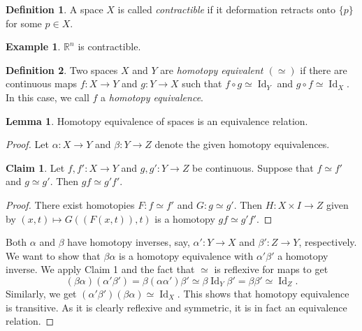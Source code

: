 \documentclass[10pt,letterpaper,cm]{nupset}
\theoremstyle{definition}
\newtheorem*{definition}{Definition}
\newtheorem{exmp}{Example}
\newtheorem{claim}{Claim}
\newtheorem{lemma}{Lemma}
\newcommand{\R}{\mathbb R}
\newcommand{\1}{\mathbf{1}}
\newcommand{\0}{\vec 0}
\DeclareMathOperator{\id}{Id}
\begin{document}
\begin{definition}
A space $X$ is called \textit{contractible} if it deformation retracts onto $\{p\}$ for some $p\in X$.
\end{definition}

\begin{exmp}
$\R^n$ is contractible.
\end{exmp}

\begin{definition}
Two spaces $X$ and $Y$ are \textit{homotopy equivalent $(\simeq)$} if there are continuous maps $f: X\to Y$ and $g: Y \to X$ such that $f\circ g \simeq \id_Y$ and $g\circ f \simeq \id_X$. In this case, we call $f$ a \textit{homotopy equivalence}.
\end{definition}

\begin{lemma}
Homotopy equivalence of spaces is an equivalence relation.
\end{lemma}
\begin{proof}
Let $\alpha : X \to Y$ and $\beta: Y \to Z$ denote the given homotopy equivalences. 
\begin{claim}
Let $f, f': X \to Y$ and $g,g' : Y \to Z$ be continuous. Suppose that $f\simeq f'$ and $g \simeq g'$. Then $gf \simeq g'f'$.
\end{claim}
\begin{proof}
There exist homotopies $F: f \simeq f'$ and $G: g \simeq g'$. Then $H: X \times I \to Z$ given by $(x,t) \mapsto G((F(x, t)), t)$ is a homotopy $gf \simeq g'f'$.
\end{proof}
Both $\alpha$ and $\beta$ have homotopy inverses, say, $\alpha': Y \to X$ and $\beta': Z \to Y$, respectively.  We want to show that $\beta \alpha$ is a homotopy equivalence with  $\alpha ' \beta'$ a homotopy inverse. We apply Claim 1 and the fact that $\simeq$ is reflexive for maps to get $$(\beta \alpha)(\alpha' \beta') = \beta (\alpha \alpha ') \beta ' \simeq \beta \id_Y  \beta ' = \beta \beta' \simeq \id_Z  .$$ Similarly, we get $(\alpha' \beta')(\beta \alpha) \simeq \id_X$. This shows that homotopy equivalence is transitive. As it is clearly reflexive and symmetric, it is in fact an equivalence relation. 
\end{proof}
\end{document}
